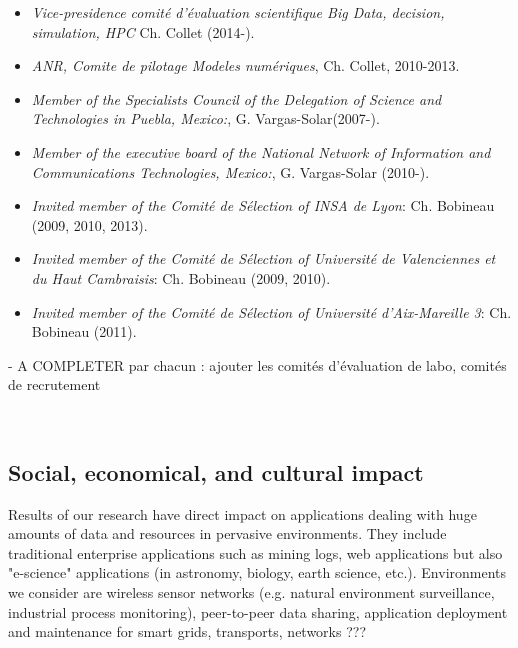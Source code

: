 \begin{itemize}
\setlength{\itemindent}{-0.5cm}
\setlength{\itemsep}{-0.1cm}


\item {\it Vice-presidence  comit{\'e} d'{\'e}valuation scientifique  Big Data, decision, simulation, HPC}   Ch. Collet (2014-).

\item {\it ANR, Comite  de pilotage Modeles num{\'e}riques}, Ch. Collet, 2010-2013.

\item {\it Member of the Specialists Council of the Delegation of Science and Technologies in Puebla, Mexico:}, G. Vargas-Solar(2007-).

\item {\it Member of the executive board of the National Network of Information and Communications Technologies, Mexico:}, G. Vargas-Solar (2010-).

\item {\it Invited member of the Comit\'e de S\'election of INSA de Lyon}: Ch. Bobineau (2009, 2010, 2013).

\item {\it Invited member of the Comit\'e de S\'election of Universit\'e de Valenciennes et du Haut Cambraisis}: Ch. Bobineau (2009, 2010).

\item {\it Invited member of the Comit\'e de S\'election of Universit\'e d'Aix-Mareille 3}: Ch. Bobineau (2011).

\end{itemize}


- A COMPLETER par chacun : ajouter les comit{\'e}s d'{\'e}valuation de labo, comit{\'e}s de recrutement


\ \\



\subsection{Social, economical, and cultural impact} %
\label{sub:hadas_social_economical_and_cultural_impact}

Results of our research have direct impact on applications dealing with huge amounts of data and resources in pervasive environments. 
They include traditional enterprise applications such as mining logs, web applications but also "e-science" applications (in astronomy, biology, earth science, etc.). 
Environments we consider are wireless sensor networks (e.g. natural environment surveillance, industrial process monitoring), peer-to-peer data sharing, application deployment and maintenance for smart grids, transports, networks ??? 

